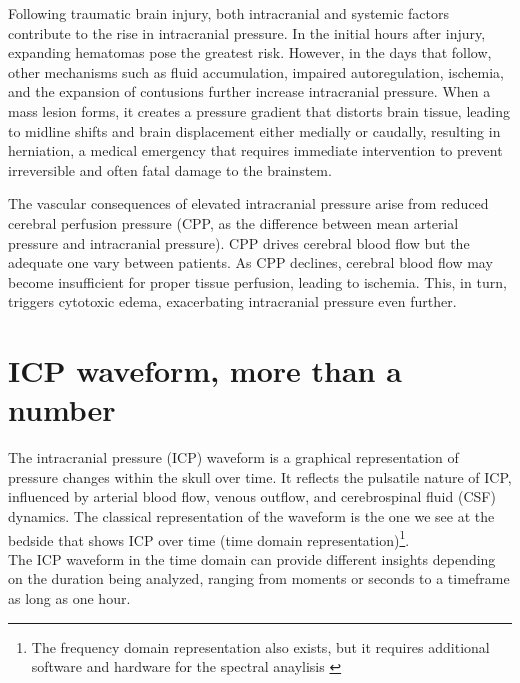 Following traumatic brain injury, both intracranial and systemic factors contribute to the rise in intracranial pressure. In the initial hours after injury, expanding hematomas pose the greatest risk. However, in the days that follow, other mechanisms such as fluid accumulation, impaired autoregulation, ischemia, and the expansion of contusions further increase intracranial pressure. When a mass lesion forms, it creates a pressure gradient that distorts brain tissue, leading to midline shifts and brain displacement either medially or caudally, resulting in herniation, a medical emergency that requires immediate intervention to prevent irreversible and often fatal damage to the brainstem.

The vascular consequences of elevated intracranial pressure arise from reduced cerebral perfusion pressure (CPP, as the difference between mean arterial pressure and intracranial pressure). CPP drives cerebral blood flow but the adequate one vary between patients. As CPP declines, cerebral blood flow may become insufficient for proper tissue perfusion, leading to ischemia. This, in turn, triggers cytotoxic edema, exacerbating intracranial pressure even further\cite{stocchettiTraumaticIntracranialHypertension2014a}.\\

\section[ICP waveform, more than a number]{ICP waveform, more than a number}
The intracranial pressure (ICP) waveform is a graphical representation of pressure changes within the skull over time. It reflects the pulsatile nature of ICP, influenced by arterial blood flow, venous outflow, and cerebrospinal fluid (CSF) dynamics.
The classical representation of the waveform is the one we see at the bedside that shows ICP over time (time domain representation)\footnote {The frequency domain representation also exists, but it requires additional software and hardware for the spectral anaylisis \cite{cuccioliniIntracranialPressureClinicians2023a}}.\\
The ICP waveform in the time domain can provide different insights depending on the duration being analyzed, ranging from moments or seconds to a timeframe as long as one hour.


